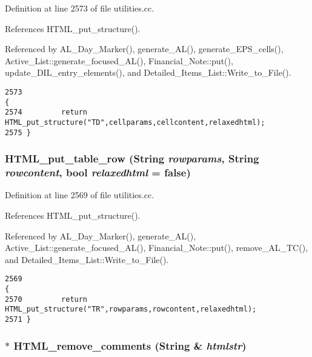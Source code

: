 Definition at line 2573 of file utilities.cc.

References HTML\_\-put\_\-structure().

Referenced by AL\_\-Day\_\-Marker(), generate\_\-AL(), generate\_\-EPS\_\-cells(), Active\_\-List::generate\_\-focused\_\-AL(), Financial\_\-Note::put(), update\_\-DIL\_\-entry\_\-elements(), and Detailed\_\-Items\_\-List::Write\_\-to\_\-File().



\footnotesize\begin{verbatim}2573                                                                                             {
2574         return HTML_put_structure("TD",cellparams,cellcontent,relaxedhtml);
2575 }
\end{verbatim}\normalsize 
{}
\subsubsection{ HTML\_\-put\_\-table\_\-row ({\bf String} {\em rowparams}, {\bf String} {\em rowcontent}, bool {\em relaxedhtml} = {\bf false})}\label{utilities_8cc_a64}




Definition at line 2569 of file utilities.cc.

References HTML\_\-put\_\-structure().

Referenced by AL\_\-Day\_\-Marker(), generate\_\-AL(), Active\_\-List::generate\_\-focused\_\-AL(), Financial\_\-Note::put(), remove\_\-AL\_\-TC(), and Detailed\_\-Items\_\-List::Write\_\-to\_\-File().



\footnotesize\begin{verbatim}2569                                                                                          {
2570         return HTML_put_structure("TR",rowparams,rowcontent,relaxedhtml);
2571 }
\end{verbatim}\normalsize 
{}
\subsubsection{$\ast$ HTML\_\-remove\_\-comments ({\bf String} \& {\em htmlstr})}\label{utilities_8cc_a61}




